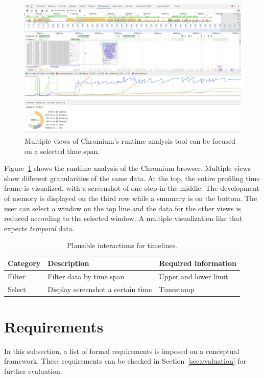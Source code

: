 \begin{figure}
  \centering
  \caption{Multiple views of Chromium's runtime analysis tool can be focused on a selected time span.}
  \label{fig:analysis:timeline}
    \includegraphics[width=\textwidth]{figures/analysis/profiler}
\end{figure}
Figure~\ref{fig:analysis:timeline} shows the runtime analysis of the Chromium browser.
Multiple views show different granularities of the same data.
At the top, the entire profiling time frame is visualized, with a screenshot of one step in the middle.
The development of memory is displayed on the third row while a summary is on the bottom.
The user can select a window on the top line and the data for the other views is reduced according to the selected window.
A multiple visualization like that expects \emph{temporal} data.

\begin{table}[H]
  \caption{Plausible interactions for timelines.}%
  \label{fig:analysis:timeline:interactions}
  \begin{tabular*}{\textwidth}{lll}
    \bf Category & \bf Description & \bf Required information \\
    \hline
    Filter & Filter data by time span & Upper and lower limit \\
    Select & Display screenshot a certain time & Timestamp  \\
  \end{tabular*}
\end{table}


\section{Requirements}\label{sec:analysis:requirements}
In this subsection, a list of formal requirements is imposed on a conceptual \cmv{} framework.
These requirements can be checked in Section~\ref{sec:evaluation} for further evaluation.

